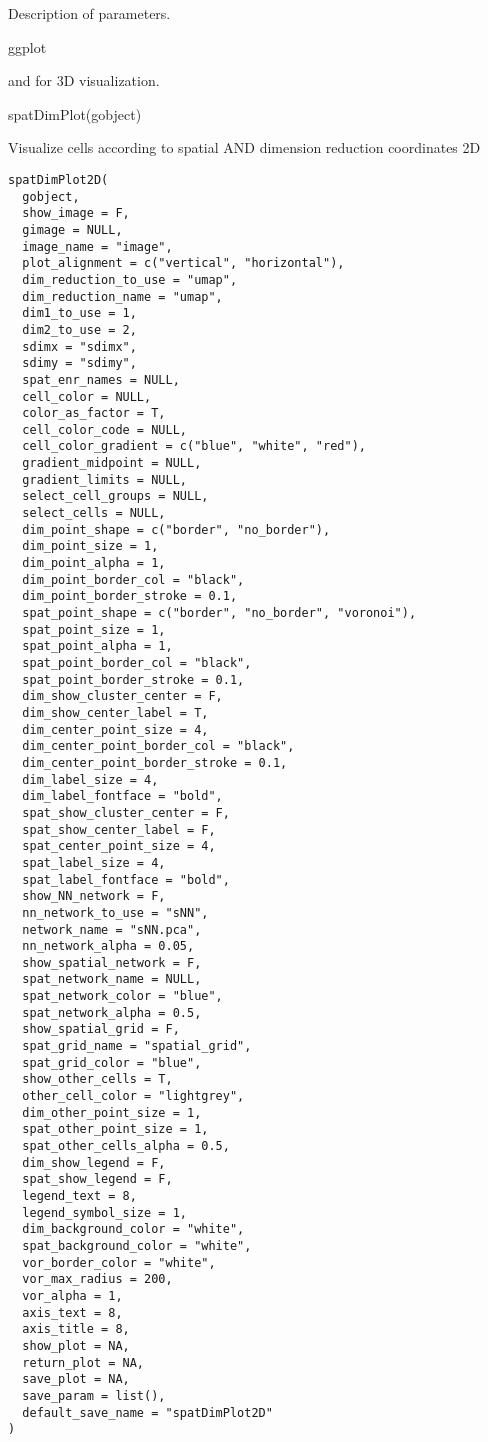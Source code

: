 \documentclass[a4paper]{book}
\begin{document}
%
\begin{Details}\relax
Description of parameters.
\end{Details}
%
\begin{Value}
ggplot
\end{Value}
%
\begin{SeeAlso}\relax
{} and  for 3D visualization.
\end{SeeAlso}
%
\begin{Examples}
\begin{ExampleCode}
    spatDimPlot(gobject)
\end{ExampleCode}
\end{Examples}
%
\begin{Description}\relax
Visualize cells according to spatial AND dimension reduction coordinates 2D
\end{Description}
%
\begin{Usage}
\begin{verbatim}
spatDimPlot2D(
  gobject,
  show_image = F,
  gimage = NULL,
  image_name = "image",
  plot_alignment = c("vertical", "horizontal"),
  dim_reduction_to_use = "umap",
  dim_reduction_name = "umap",
  dim1_to_use = 1,
  dim2_to_use = 2,
  sdimx = "sdimx",
  sdimy = "sdimy",
  spat_enr_names = NULL,
  cell_color = NULL,
  color_as_factor = T,
  cell_color_code = NULL,
  cell_color_gradient = c("blue", "white", "red"),
  gradient_midpoint = NULL,
  gradient_limits = NULL,
  select_cell_groups = NULL,
  select_cells = NULL,
  dim_point_shape = c("border", "no_border"),
  dim_point_size = 1,
  dim_point_alpha = 1,
  dim_point_border_col = "black",
  dim_point_border_stroke = 0.1,
  spat_point_shape = c("border", "no_border", "voronoi"),
  spat_point_size = 1,
  spat_point_alpha = 1,
  spat_point_border_col = "black",
  spat_point_border_stroke = 0.1,
  dim_show_cluster_center = F,
  dim_show_center_label = T,
  dim_center_point_size = 4,
  dim_center_point_border_col = "black",
  dim_center_point_border_stroke = 0.1,
  dim_label_size = 4,
  dim_label_fontface = "bold",
  spat_show_cluster_center = F,
  spat_show_center_label = F,
  spat_center_point_size = 4,
  spat_label_size = 4,
  spat_label_fontface = "bold",
  show_NN_network = F,
  nn_network_to_use = "sNN",
  network_name = "sNN.pca",
  nn_network_alpha = 0.05,
  show_spatial_network = F,
  spat_network_name = NULL,
  spat_network_color = "blue",
  spat_network_alpha = 0.5,
  show_spatial_grid = F,
  spat_grid_name = "spatial_grid",
  spat_grid_color = "blue",
  show_other_cells = T,
  other_cell_color = "lightgrey",
  dim_other_point_size = 1,
  spat_other_point_size = 1,
  spat_other_cells_alpha = 0.5,
  dim_show_legend = F,
  spat_show_legend = F,
  legend_text = 8,
  legend_symbol_size = 1,
  dim_background_color = "white",
  spat_background_color = "white",
  vor_border_color = "white",
  vor_max_radius = 200,
  vor_alpha = 1,
  axis_text = 8,
  axis_title = 8,
  show_plot = NA,
  return_plot = NA,
  save_plot = NA,
  save_param = list(),
  default_save_name = "spatDimPlot2D"
)
\end{verbatim}
\end{Usage}
\end{document}
